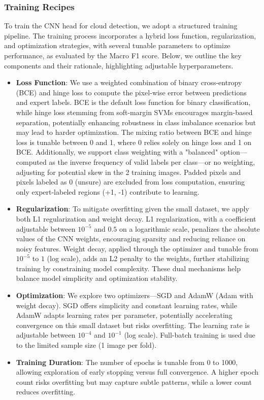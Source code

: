 \documentclass[10pt,letterpaper]{article}
\begin{document}
\subsubsection{Training Recipes}

To train the CNN head for cloud detection, we adopt a structured training pipeline. The training process incorporates a hybrid loss function, regularization, and optimization strategies, with several tunable parameters to optimize performance, as evaluated by the Macro F1 score. Below, we outline the key components and their rationale, highlighting adjustable hyperparameters.

\begin{itemize}
    \item \textbf{Loss Function}: We use a weighted combination of binary cross-entropy (BCE) and hinge loss to compute the pixel-wise error between predictions and expert labels. BCE is the default loss function for binary classification, while hinge loss stemming from soft-margin SVMs encourages margin-based separation, potentially enhancing robustness in class imbalance scenarios but may lead to harder optimization. The mixing ratio between BCE and hinge loss is tunable between 0 and 1, where 0 relies solely on hinge loss and 1 on BCE. Additionally, we support class weighting with a "balanced" option—computed as the inverse frequency of valid labels per class—or no weighting, adjusting for potential skew in the 2 training images. Padded pixels and pixels labeled as 0 (unsure) are excluded from loss computation, ensuring only expert-labeled regions (+1, -1) contribute to learning.

    \item \textbf{Regularization}: To mitigate overfitting given the small dataset, we apply both L1 regularization and weight decay. L1 regularization, with a coefficient adjustable between \(10^{-5}\) and \(0.5\) on a logarithmic scale, penalizes the absolute values of the CNN weights, encouraging sparsity and reducing reliance on noisy features. Weight decay, applied through the optimizer and tunable from \(10^{-5}\) to \(1\) (log scale), adds an L2 penalty to the weights, further stabilizing training by constraining model complexity. These dual mechanisms help balance model simplicity and optimization stability.

    \item \textbf{Optimization}: We explore two optimizers—SGD and AdamW (Adam with weight decay). SGD offers simplicity and constant learning rates, while AdamW adapts learning rates per parameter, potentially accelerating convergence on this small dataset but risks overfitting. The learning rate is adjustable between \(10^{-4}\) and \(10^{-1}\) (log scale). Full-batch training is used due to the limited sample size (1 image per fold).

    \item \textbf{Training Duration}: The number of epochs is tunable from 0 to 1000, allowing exploration of early stopping versus full convergence. A higher epoch count risks overfitting but may capture subtle patterns, while a lower count reduces overfitting.

\end{itemize}
\end{document}
